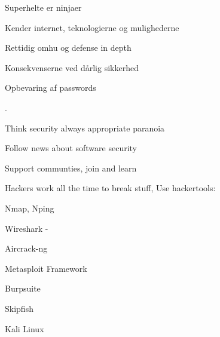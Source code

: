 \documentclass[20pt,landscape,a4paper,footrule]{foils}
\begin{document}

\begin{list1}
\item Superhelte er ninjaer
\item Kender internet, teknologierne og mulighederne
\item Rettidig omhu og defense in depth
\item Konsekvenserne ved dårlig sikkerhed
\end{list1}




\centerline{Opbevaring af passwords}






.

\begin{list1}
\item Think security always appropriate paranoia
\item Follow news about software security
\item Support communties, join and learn
\end{list1}





\begin{list2}
\item Hackers work all the time to break stuff, Use hackertools:
\item Nmap, Nping 
\item Wireshark - 
\item Aircrack-ng 
\item Metasploit Framework 
\item Burpsuite 
\item Skipfish 
\item Kali Linux 
\end{list2}
\end{document}
